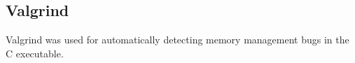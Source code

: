 \subsection{Valgrind}
Valgrind was used for automatically detecting memory management bugs in the C executable.
